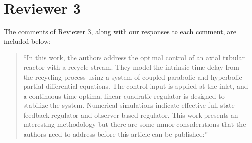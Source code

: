 \documentclass[12pt,answers]{exam}
\begin{document}
\newpage
\section*{Reviewer 3}

The comments of Reviewer 3, along with our responses to each comment, are included below:

\begin{quote}
    ``In this work, the authors address the optimal control of an axial tubular reactor with a recycle stream. They model the intrinsic time delay from the recycling process using a system of coupled parabolic and hyperbolic partial differential equations. The control input is applied at the inlet, and a continuous-time optimal linear quadratic regulator is designed to stabilize the system. Numerical simulations indicate effective full-state feedback regulator and observer-based regulator. This work presents an interesting methodology but there are some minor considerations that the authors need to address before this article can be published:''
\end{quote}
\end{document}
